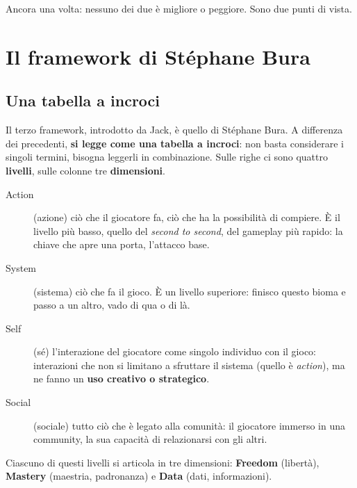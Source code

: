 Ancora una volta: nessuno dei due è migliore o peggiore. Sono due punti di
vista.

\section{Il framework di Stéphane Bura}
\label{sec:bura}

\subsection{Una tabella a incroci}



Il terzo framework, introdotto da Jack, è quello di Stéphane Bura. A
differenza dei precedenti, \textbf{si legge come una tabella a incroci}: non
basta considerare i singoli termini, bisogna leggerli in combinazione. Sulle
righe ci sono quattro \textbf{livelli}, sulle colonne tre \textbf{dimensioni}.

\begin{description}
  \item[Action] (azione) ciò che il giocatore fa, ciò che ha la possibilità di
        compiere. È il livello più basso, quello del \emph{second to second},
        del gameplay più rapido: la chiave che apre una porta, l'attacco base.
  \item[System] (sistema) ciò che fa il gioco. È un livello superiore: finisco
        questo bioma e passo a un altro, vado di qua o di là.
  \item[Self] (sé) l'interazione del giocatore come singolo individuo con il
        gioco: interazioni che non si limitano a sfruttare il sistema (quello è
        \emph{action}), ma ne fanno un \textbf{uso creativo o strategico}.
  \item[Social] (sociale) tutto ciò che è legato alla comunità: il giocatore
        immerso in una community, la sua capacità di relazionarsi con gli
        altri.
\end{description}
Ciascuno di questi livelli si articola in tre dimensioni: \textbf{Freedom}
(libertà), \textbf{Mastery} (maestria, padronanza) e \textbf{Data} (dati,
informazioni).

